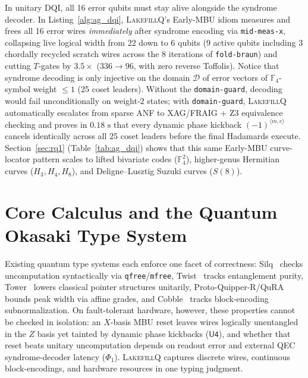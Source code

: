 \documentclass[acmsmall,screen,anonymous]{acmart}
\DeclareRobustCommand{\_}{\ifmmode\text{\char95}\else\char95\penalty0\relax\fi}
\theoremstyle{plain}
\newcommand{\LakefillQ}{\textsc{LakefillQ}}
\begin{document}
In unitary DQI, all 16 error qubits must stay alive alongside the syndrome decoder. In Listing~\ref{alg:ag_dqi}, \LakefillQ{}'s Early-MBU idiom measures and frees all 16 error wires \emph{immediately} after syndrome encoding via \texttt{mid-meas-x}, collapsing live logical width from 22 down to 6 qubits (9 active qubits including 3 chordally recycled scratch wires across the 8 iterations of \texttt{fold-braun}) and cutting $T$-gates by $3.5\times$ ($336 \to 96$, with zero reverse Toffolis). Notice that syndrome decoding is only injective on the domain $\mathcal{D}$ of error vectors of $\mathbb{F}_4$-symbol weight $\le 1$ (25 coset leaders). Without the \texttt{domain-guard}, decoding would fail unconditionally on weight-$2$ states; with \texttt{domain-guard}, \LakefillQ{} automatically escalates from sparse ANF to XAG/FRAIG + Z3 equivalence checking and proves in $0.18\text{ s}$ that every dynamic phase kickback $(-1)^{\langle m, e\rangle}$ cancels identically across all 25 coset leaders before the final Hadamards execute. Section~\ref{sec:rq1} (Table~\ref{tab:ag_dqi}) shows that this same Early-MBU curve-locator pattern scales to lifted bivariate codes ($\mathbb{F}_4^2$), higher-genus Hermitian curves ($H_3, H_4, H_8$), and Deligne--Lusztig Suzuki curves ($S(8)$).
\section{Core Calculus and the Quantum Okasaki Type System}
\label{sec:calculus}

Existing quantum type systems each enforce one facet of correctness: Silq~\cite{bichsel2020} checks uncomputation syntactically via \texttt{qfree}/\texttt{mfree}, Twist~\cite{yuan2022twist} tracks entanglement purity, Tower~\cite{yuan2022tower} lowers classical pointer structures unitarily, Proto-Quipper-R/QuRA~\cite{colledan2025protoquipperr} bounds peak width via affine grades, and Cobble~\cite{cobble2026} tracks block-encoding subnormalization. On fault-tolerant hardware, however, these properties cannot be checked in isolation: an $X$-basis MBU reset leaves wires logically unentangled in the $Z$ basis yet tainted by dynamic phase kickbacks ($\mathsf{U4}$), and whether that reset beats unitary uncomputation depends on readout error and external QEC syndrome-decoder latency ($\Phi_1$). \LakefillQ{} captures discrete wires, continuous block-encodings, and hardware resources in one typing judgment.
\end{document}
